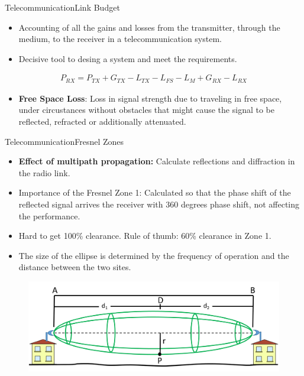 \begin{frame}{Telecommunication}{Link Budget}
      \begin{block}{}
        \begin{itemize}
          \item {Accounting of all the gains and losses from the transmitter, through the medium, to the receiver in a telecommunication system.}
          \item {Decisive tool to desing a system and meet the requirements.}
        \end{itemize}
      \end{block}
    \begin{align*}      
        P_{RX} = P_{TX} + G_{TX} - L_{TX} - L_{FS} - L_{M} + G_{RX} - L_{RX}
    \end{align*}
     \begin{itemize}
     \item{\textbf{Free Space Loss}: Loss in signal strength due to traveling in free space, under circustances without obstacles that might cause the signal to be reflected, refracted or additionally attenuated.}
      \end{itemize}

\end{frame}

\begin{frame}{Telecommunication}{Fresnel Zones}
   \begin{block}{}
        \begin{itemize}
          \item {\textbf{Effect of multipath propagation:} Calculate reflections and diffraction in the radio link.}
          \item {Importance of the Fresnel Zone 1: Calculated so that the phase shift of the reflected signal arrives the receiver with 360 degrees phase shift, not affecting the performance.}
          \item {Hard to get 100\% clearance. Rule of thumb: 60\% clearance in Zone 1.}
          \item {The size of the ellipse is determined by the frequency of operation and the distance between the two sites.}
        \end{itemize}
      \end{block}
      \begin{figure}
        \includegraphics[scale=0.3]{figures/fresnel_zone.png}
      \end{figure}

\end{frame}